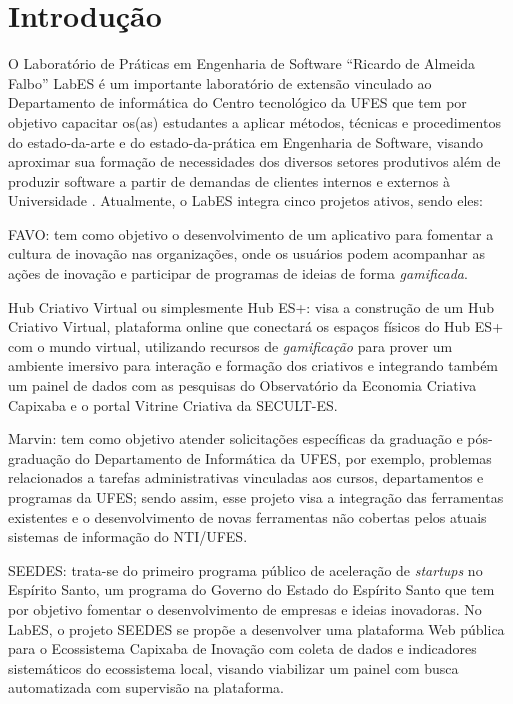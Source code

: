 \chapter{Introdução}
\label{sec-intro}

O Laboratório de Práticas em Engenharia de Software “Ricardo de Almeida Falbo” LabES é um importante laboratório de extensão vinculado ao Departamento de informática do Centro tecnológico da UFES que tem por objetivo capacitar os(as) estudantes a aplicar métodos, técnicas e procedimentos do estado-da-arte e do estado-da-prática em Engenharia de Software, visando aproximar sua formação de necessidades dos diversos setores produtivos além de produzir software a partir de demandas de clientes internos e externos à Universidade \cite{LabES}. Atualmente, o LabES integra cinco projetos ativos, sendo eles:

FAVO: tem como objetivo o desenvolvimento de um aplicativo para fomentar a cultura de inovação nas organizações, onde os usuários podem acompanhar as ações de inovação e participar de programas de ideias de forma \textit{gamificada}.

Hub Criativo Virtual ou simplesmente Hub ES+: visa a construção de um Hub Criativo Virtual, plataforma online que conectará os espaços físicos do Hub ES+ com o mundo virtual, utilizando recursos de \textit{gamificação} para prover um ambiente imersivo para interação e formação dos criativos e integrando também um painel de dados com as pesquisas do Observatório da Economia Criativa Capixaba e o portal Vitrine Criativa da SECULT-ES.

Marvin: tem como objetivo atender solicitações específicas da graduação e pós-graduação do Departamento de Informática da UFES, por exemplo, problemas relacionados a tarefas administrativas vinculadas aos cursos, departamentos e programas da UFES; sendo assim, esse projeto visa a integração das ferramentas existentes e o desenvolvimento de novas ferramentas não cobertas pelos atuais sistemas de informação do NTI/UFES.

SEEDES: trata-se do primeiro programa público de aceleração de \textit{startups} no Espírito Santo, um programa do Governo do Estado do Espírito Santo que tem por objetivo fomentar o desenvolvimento de empresas e ideias inovadoras. No LabES, o projeto SEEDES se propõe a desenvolver uma plataforma Web pública para o Ecossistema Capixaba de Inovação com coleta de dados e indicadores sistemáticos do ecossistema local, visando viabilizar um painel com busca automatizada com supervisão na plataforma.

